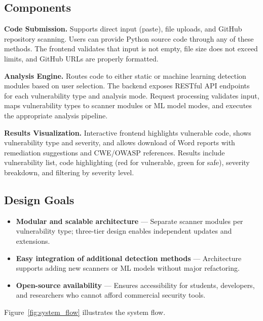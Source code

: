 \subsection{Components}
\label{sec:web_components}

\textbf{Code Submission.} Supports direct input (paste), file uploads, and GitHub repository scanning. Users can provide Python source code through any of these methods. The frontend validates that input is not empty, file size does not exceed limits, and GitHub URLs are properly formatted.

\textbf{Analysis Engine.} Routes code to either static or machine learning detection modules based on user selection. The backend exposes RESTful API endpoints for each vulnerability type and analysis mode. Request processing validates input, maps vulnerability types to scanner modules or ML model modes, and executes the appropriate analysis pipeline.

\textbf{Results Visualization.} Interactive frontend highlights vulnerable code, shows vulnerability type and severity, and allows download of Word reports with remediation suggestions and CWE/OWASP references. Results include vulnerability list, code highlighting (red for vulnerable, green for safe), severity breakdown, and filtering by severity level.

\subsection{Design Goals}
\label{sec:design_goals}

\begin{itemize}
	\item \textbf{Modular and scalable architecture} --- Separate scanner modules per vulnerability type; three-tier design enables independent updates and extensions.
	\item \textbf{Easy integration of additional detection methods} --- Architecture supports adding new scanners or ML models without major refactoring.
	\item \textbf{Open-source availability} --- Ensures accessibility for students, developers, and researchers who cannot afford commercial security tools.
\end{itemize}

Figure~\ref{fig:system_flow} illustrates the system flow.

